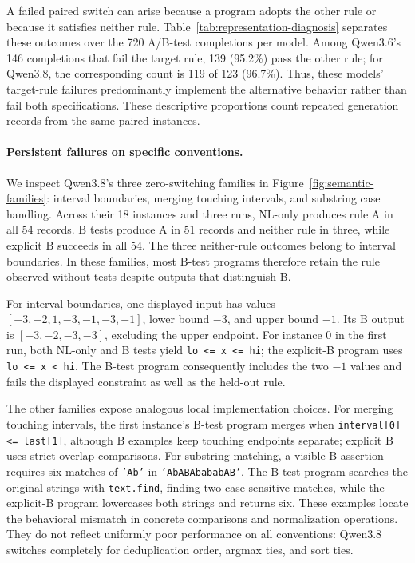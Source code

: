 \documentclass[acmsmall,screen,review,anonymous]{acmart}
\begin{document}
A failed paired switch can arise because a program adopts the other rule or because it satisfies neither rule.
Table~\ref{tab:representation-diagnosis} separates these outcomes over the 720 A/B-test completions per model.
Among Qwen3.6's 146 completions that fail the target rule, 139 (95.2\%) pass the other rule; for Qwen3.8, the corresponding count is 119 of 123 (96.7\%).
Thus, these models' target-rule failures predominantly implement the alternative behavior rather than fail both specifications.
These descriptive proportions count repeated generation records from the same paired instances.



\paragraph{Persistent failures on specific conventions.}
We inspect Qwen3.8's three zero-switching families in Figure~\ref{fig:semantic-families}: interval boundaries, merging touching intervals, and substring case handling.
Across their 18 instances and three runs, NL-only produces rule A in all 54 records.
B tests produce A in 51 records and neither rule in three, while explicit B succeeds in all 54.
The three neither-rule outcomes belong to interval boundaries.
In these families, most B-test programs therefore retain the rule observed without tests despite outputs that distinguish B.

For interval boundaries, one displayed input has values $[-3,-2,1,-3,-1,-3,-1]$, lower bound $-3$, and upper bound $-1$.
Its B output is $[-3,-2,-3,-3]$, excluding the upper endpoint.
For instance 0 in the first run, both NL-only and B tests yield \texttt{lo <= x <= hi}; the explicit-B program uses \texttt{lo <= x < hi}.
The B-test program consequently includes the two $-1$ values and fails the displayed constraint as well as the held-out rule.

The other families expose analogous local implementation choices.
For merging touching intervals, the first instance's B-test program merges when \texttt{interval[0] <= last[1]}, although B examples keep touching endpoints separate; explicit B uses strict overlap comparisons.
For substring matching, a visible B assertion requires six matches of \texttt{'Ab'} in \texttt{'AbABAbababAB'}.
The B-test program searches the original strings with \texttt{text.find}, finding two case-sensitive matches, while the explicit-B program lowercases both strings and returns six.
These examples locate the behavioral mismatch in concrete comparisons and normalization operations.
They do not reflect uniformly poor performance on all conventions: Qwen3.8 switches completely for deduplication order, argmax ties, and sort ties.
\end{document}
